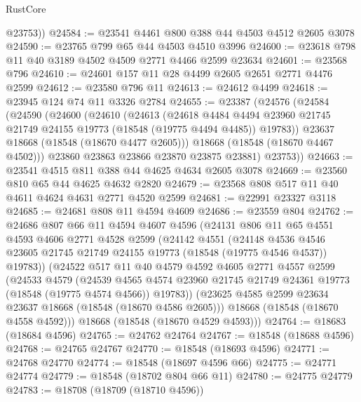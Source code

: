 \begin{lexlean}{RustCore}
\begin{coremodule}
        @23753))
@24584 := @23541 @4461 @800 @388 @44 @4503 @4512 @2605 @3078
@24590 := @23765 @799 @65 @44 @4503 @4510 @3996
@24600 := @23618 @798 @11 @40 @3189 @4502 @4509 @2771 @4466 @2599 @23634
@24601 := @23568 @796
@24610 := @24601 @157 @11 @28 @4499 @2605 @2651 @2771 @4476 @2599
@24612 := @23580 @796 @11
@24613 := @24612 @4499
@24618 := @23945 @124 @74 @11 @3326 @2784
@24655 := @23387
    (@24576
      (@24584
        (@24590
          (@24600
            (@24610
              (@24613
                (@24618
                  @4484
                  @4494
                  @23960
                  @21745
                  @21749
                  @24155
                  @19773
                  (@18548 (@19775 @4494 @4485))
                  @19783))
              @23637
              @18668
              (@18548 (@18670 @4477 @2605)))
            @18668
            (@18548 (@18670 @4467 @4502)))
          @23860
          @23863
          @23866
          @23870
          @23875
          @23881)
        @23753))
@24663 := @23541 @4515 @811 @388 @44 @4625 @4634 @2605 @3078
@24669 := @23560 @810 @65 @44 @4625 @4632 @2820
@24679 := @23568 @808 @517 @11 @40 @4611 @4624 @4631 @2771 @4520 @2599
@24681 := @22991 @23327 @3118
@24685 := @24681 @808 @11 @4594 @4609
@24686 := @23559 @804
@24762 := @24686
    @807
    @66
    @11
    @4594
    @4607
    @4596
    (@24131
      @806
      @11
      @65
      @4551
      @4593
      @4606
      @2771
      @4528
      @2599
      (@24142
        @4551
        (@24148
          @4536
          @4546
          @23605
          @21745
          @21749
          @24155
          @19773
          (@18548 (@19775 @4546 @4537))
          @19783))
      (@24522
        @517
        @11
        @40
        @4579
        @4592
        @4605
        @2771
        @4557
        @2599
        (@24533
          @4579
          (@24539
            @4565
            @4574
            @23960
            @21745
            @21749
            @24361
            @19773
            (@18548 (@19775 @4574 @4566))
            @19783))
        (@23625 @4585 @2599 @23634 @23637 @18668 (@18548 (@18670 @4586 @2605)))
        @18668
        (@18548 (@18670 @4558 @4592)))
      @18668
      (@18548 (@18670 @4529 @4593)))
@24764 := @18683 (@18684 @4596)
@24765 := @24762 @24764
@24767 := @18548 (@18688 @4596)
@24768 := @24765 @24767
@24770 := @18548 (@18693 @4596)
@24771 := @24768 @24770
@24774 := @18548 (@18697 @4596 @66)
@24775 := @24771 @24774
@24779 := @18548 (@18702 @804 @66 @11)
@24780 := @24775 @24779
@24783 := @18708 (@18709 (@18710 @4596))

\end{coremodule}
\end{lexlean}
